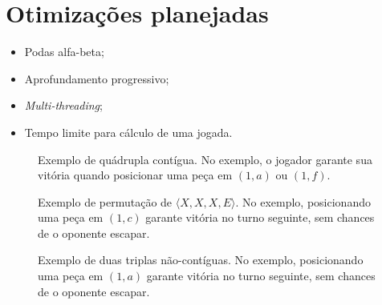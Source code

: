 \documentclass{article}
\begin{document}
    \section{Otimizações planejadas}

    \begin{itemize}
        \item Podas alfa-beta;
        \item Aprofundamento progressivo;
        \item \textit{Multi-threading};
        \item Tempo limite para cálculo de uma jogada.
    \end{itemize}

    \begin{figure}[ht]
        \centering
        \caption{Exemplo de quádrupla contígua. No exemplo, o
        jogador garante sua vitória quando posicionar uma peça
        em $(1, a)$ ou $(1, f)$.\label{win-four}}
        \begin{othelloboard}{1}
            \dotmarkings{}
        \end{othelloboard}
    \end{figure}

    \begin{figure}
        \centering
        \caption{Exemplo de permutação de $\langle X, X, X, E
        \rangle$. No exemplo, posicionando uma peça em $(1, c)$
        garante vitória no turno seguinte, sem chances de o
        oponente escapar.\label{win-four-permut}}
        \begin{othelloboard}{1}
            \dotmarkings{}
        \end{othelloboard}
    \end{figure}

    \begin{figure}
        \centering
        \caption{Exemplo de duas triplas não-contíguas. No
        exemplo, posicionando uma peça em $(1, a)$ garante
        vitória no turno seguinte, sem chances de o oponente
        escapar.\label{win-shared-triple}}
        \begin{othelloboard}{1}
            \dotmarkings{}
        \end{othelloboard}
    \end{figure}
\end{document}
